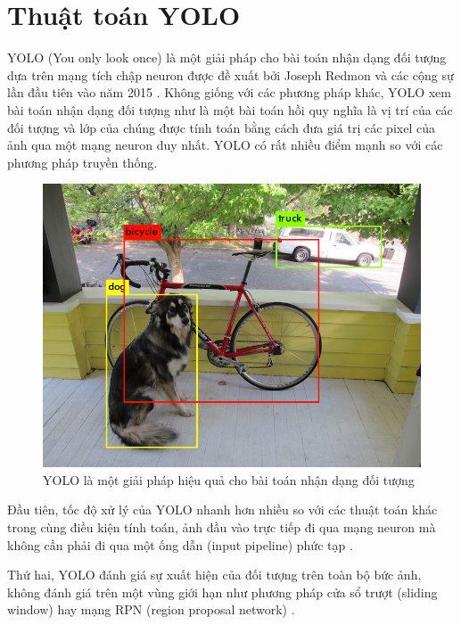 \documentclass[../thesis.tex]{subfiles}
\begin{document}
\section{Thuật toán YOLO}

YOLO (You only look once) là một giải pháp cho bài toán nhận dạng đối tượng dựa trên mạng tích chập neuron được đề xuất bởi Joseph Redmon và các cộng sự lần đầu tiên vào năm 2015 \cite{DBLP:journals/corr/RedmonDGF15}. Không giống với các phương pháp khác, YOLO xem bài toán nhận dạng đối tượng như là một bài toán hồi quy nghĩa là vị trí của các đối tượng và lớp của chúng được tính toán bằng cách đưa giá trị các pixel của ảnh qua một mạng neuron duy nhất. YOLO có rất nhiều điểm mạnh so với các phương pháp truyền thống.

\begin{figure}[H]
    \begin{center}
        \includegraphics[width=\linewidth]{images/yolo_predictions.png}
    \end{center}
    \caption{YOLO là một giải pháp hiệu quả cho bài toán nhận dạng đối tượng}
    \label{yolo_detections}
\end{figure}

Đầu tiên, tốc độ xử lý của YOLO nhanh hơn nhiều so với các thuật toán khác trong cùng điều kiện tính toán, ảnh đầu vào trực tiếp đi qua mạng neuron mà không cần phải đi qua một ống dẫn (input pipeline) phức tạp \cite{DBLP:journals/corr/RedmonDGF15}.

Thứ hai, YOLO đánh giá sự xuất hiện của đối tượng trên toàn bộ bức ảnh, không đánh giá trên một vùng giới hạn như phương pháp cửa sổ trượt (sliding window) hay mạng RPN (region proposal network) \cite{DBLP:journals/corr/RedmonDGF15}.
\end{document}
